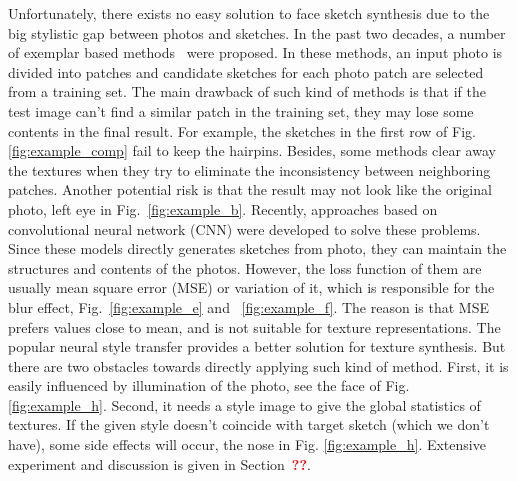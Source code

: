 \documentclass[10pt,twocolumn,letterpaper]{article}
\def\red[#1]{\textcolor{red}{\textbf{#1}}}
\begin{document}
Unfortunately, there exists no easy solution to face sketch synthesis due to the big stylistic gap between photos and sketches. In the past two decades, a number of exemplar based methods~\cite{wang2009face,song2014real, zhang2010lighting,zhou2012markov} were proposed. In these methods, an input photo is divided into patches and candidate sketches for each photo patch are selected from a training set. The main drawback of such kind of methods is that if the test image can't find a similar patch in the training set, they may lose some contents in the final result. For example, the sketches in the first row of Fig.\ref{fig:example_comp} fail to keep the hairpins. Besides, some methods \cite{song2014real,zhou2012markov} clear away the textures when they try to eliminate the inconsistency between neighboring patches. Another potential risk is that the result may not look like the original photo, \eg left eye in Fig.~\ref{fig:example_b}. Recently, approaches \cite{zhang2017content,zhang2015end} based on convolutional neural network (CNN) were developed to solve these problems. Since these models directly generates sketches from photo, they can maintain the structures and contents of the photos. However, the loss function of them are usually mean square error (MSE) or variation of it, which is responsible for the blur effect, \eg Fig.~\ref{fig:example_e} and ~\ref{fig:example_f}. The reason is that MSE prefers values close to mean, and is not suitable for texture representations. The popular neural style transfer provides a better solution for texture synthesis. But there are two obstacles towards directly applying such kind of method. First, it is easily influenced by illumination of the photo, see the face of Fig. \ref{fig:example_h}. Second, it needs a style image to give the global statistics of textures. If the given style doesn't coincide with target sketch (which we don't have), some side effects will occur, \eg the nose in Fig. \ref{fig:example_h}. Extensive experiment and discussion is given in Section~\red[??]. 
\end{document}
